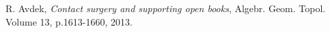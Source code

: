 \documentclass[11pt]{amsart}
\begin{document}
\begin{comment}
The OOB $B_{1}$ is attached along a ball in $\Sigma$, so maybe it's possible that it could be avoided during any handle-slides and changing of the orders of bypasses, guaranteeing $B'_{k'} = B_{1}$. If true, then $\Sigma$ would be determined by the model OOB attachment described in \S \ref{Sec:OOExample}. Perhaps this is overly optimistic. Assuming that the strategy of rearranging the orders of bypasses works, I don't know if it would be any easier to prove using DPFs or usual contact handle attachments.
\end{comment}

\begin{thebibliography}{}
\begin{comment}

\bibitem[Abb11]{Abbas:JBook}
C. Abbas, \textit{Holomorphic open book decompositions}, Duke Math. J., Vol. 158, p.29-82, 2011.

\bibitem[AbbCH05]{ACH:PlanarWeinstein}
C. Abbas, K. Cieliebak, H. Hofer, \textit{The Weinstein conjecture fcdor planar contact structures in dimension three}, Comment. Math. Helv. 80, p.771–793, 2005.

\bibitem[AS06]{AS:Cotangent}
A. Abbondandolo and M. Schwarz, \textit{On the Floer homology of cotangent bundles}, Comm.
Pure Appl. Math., 59, p.254–316, 2006.

\bibitem[Abo15]{Abouzaid:Viterbo}
M. Abouzaid, \textit{Symplectic cohomology and Viterbo’s theorem}, In ``Free loop
spaces in geometry and topology'', volume 24 of IRMA Lect. Math. Theor. Phys., Eur. Math. Soc., Z\"{u}rich, p.271–485, 2015

\bibitem[Al79]{Ahlfors}
L. Ahlfors, \textit{Complex Analysis: An Introduction to the Theory of Analytic Functions of One Complex Variable}, New York: McGraw-Hill, 1979.


\bibitem[AS08]{AS:Pencil}
D. Auroux and I. Smith, \textit{Lefschetz pencils, branched covers and symplectic invariants}, in \textit{Symplectic 4-manifolds and algebraic surfaces}, Lecture Notes in Math vol. 1938, Springer, Berlin, p.1–53, 2008.
\end{comment}

R. Avdek, \textit{Contact surgery and supporting open books}, Algebr. Geom. Topol. Volume 13, p.1613-1660, 2013.

\begin{comment}
\bibitem[Av20]{Avdek:Dynamics}
R. Avdek, \textit{Combinatorial Reeb dynamics on punctured contact $3$-manifolds}, to appear in Geom. Topol., arXiv:2005.11428, 2020.


\end{comment}
\end{thebibliography}
\end{document}
